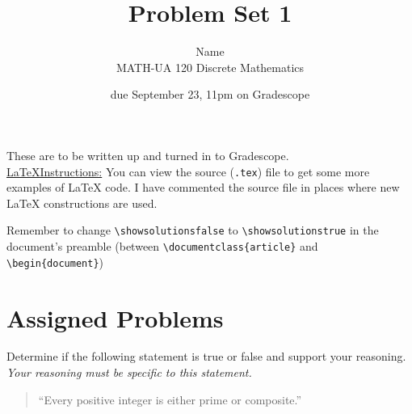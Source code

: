 \documentclass{article}
\title{Problem Set 1}
\author{%
    Name
\\  MATH-UA 120 Discrete Mathematics
}
\date{due September 23, 11pm on Gradescope}
\newif\ifshowsolutions
\newcommand{\danger}{\marginpar[\hfill\dbend]{\dbend\hfill}}
\theoremstyle{definition}
\begin{document}
\maketitle



These are to be written up and turned in to Gradescope.\\



\ifshowsolutions
    \SetupExSheets{solution/print=true}
\else
    \danger
 \underline{ \LaTeX  Instructions:}  You can view the source (\texttt{.tex}) file to get some more examples of \LaTeX{} code.  I have commented the source file in places where new \LaTeX{} constructions are used.
  
  Remember to change \verb|\showsolutionsfalse| to \verb|\showsolutionstrue|
    in the document's preamble 
    (between \verb|\documentclass{article}| and \verb|\begin{document}|)
\fi

\section*{Assigned Problems}

\begin{question}
Determine if the following statement is true or false and support your reasoning. \emph{Your reasoning must be specific to this statement.}
\begin{quote}
``Every positive integer is either prime or composite.''
\end{quote}
\end{question}
\begin{solution}
\end{solution}
\end{document}
